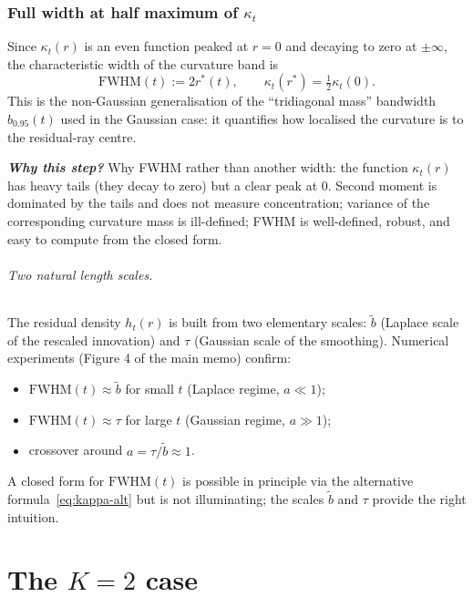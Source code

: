 \documentclass[11pt,a4paper,openany]{book}
\theoremstyle{plainserif}
\theoremstyle{definition}
\theoremstyle{remarkstyle}
\newenvironment{whybox}{%
  \begin{center}\begin{minipage}{0.95\linewidth}\small
  \textbf{\textit{Why this step?}}\quad\ignorespaces}{%
  \end{minipage}\end{center}}
\newcommand{\btilde}{\tilde{b}}
\begin{document}
\section{Full width at half maximum of $\kappa_t$}

Since $\kappa_t(r)$ is an even function peaked at $r=0$ and decaying to
zero at $\pm\infty$, the characteristic width of the curvature
band is
\begin{equation}
\mathrm{FWHM}(t) := 2 r^*(t), \qquad \kappa_t(r^*) = \tfrac{1}{2}\kappa_t(0).
\end{equation}
This is the non-Gaussian generalisation of the ``tridiagonal mass''
bandwidth $b_{0.95}(t)$ used in the Gaussian case: it quantifies how
localised the curvature is to the residual-ray centre.

\begin{whybox}
Why FWHM rather than another width: the function $\kappa_t(r)$ has
heavy tails (they decay to zero) but a clear peak at $0$. Second moment
is dominated by the tails and does not measure concentration; variance
of the corresponding curvature mass is ill-defined; FWHM is
well-defined, robust, and easy to compute from the closed form.
\end{whybox}

\paragraph{Two natural length scales.}
The residual density $h_t(r)$ is built from two elementary scales:
$\btilde$ (Laplace scale of the rescaled innovation) and $\tau$
(Gaussian scale of the smoothing). Numerical experiments (Figure 4 of
the main memo) confirm:
\begin{itemize}[leftmargin=2em, topsep=3pt]
\item $\mathrm{FWHM}(t) \approx \btilde$ for small $t$ (Laplace regime, $a\ll 1$);
\item $\mathrm{FWHM}(t) \approx \tau$ for large $t$ (Gaussian regime, $a\gg 1$);
\item crossover around $a = \tau/\btilde \approx 1$.
\end{itemize}
A closed form for $\mathrm{FWHM}(t)$ is possible in principle via the
alternative formula~\eqref{eq:kappa-alt} but is not illuminating;
the scales $\btilde$ and $\tau$ provide the right intuition.


\part{The $K{=}2$ case}
\end{document}
